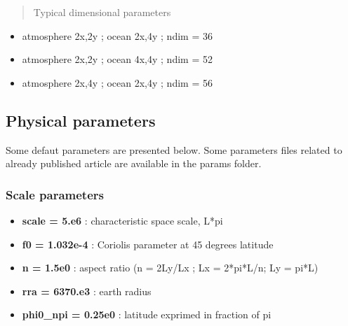 \documentclass[letterpaper,10pt,english]{sphinxmanual}
\begin{document}
\begin{quote}\begin{description}
\item[{Typical dimensional parameters}] \leavevmode
\end{description}\end{quote}
\begin{itemize}
\item {} 
atmosphere 2x,2y ; ocean 2x,4y ; ndim = 36

\item {} 
atmosphere 2x,2y ; ocean 4x,4y ; ndim = 52

\item {} 
atmosphere 2x,4y ; ocean 2x,4y ; ndim = 56

\end{itemize}


\subsection{Physical parameters}
\label{rstfiles/params_maooam:physical-parameters}
Some defaut parameters are presented below.
Some parameters files related to already published article are available in the params folder.


\subsubsection{Scale parameters}
\label{rstfiles/params_maooam:scale-parameters}\begin{itemize}
\item {} 
\textbf{scale = 5.e6}  : characteristic space scale, L*pi

\item {} 
\textbf{f0 = 1.032e-4}  : Coriolis parameter at 45 degrees latitude

\item {} 
\textbf{n = 1.5e0}  : aspect ratio (n = 2Ly/Lx ; Lx = 2*pi*L/n; Ly = pi*L)

\item {} 
\textbf{rra = 6370.e3}  : earth radius

\item {} 
\textbf{phi0\_npi = 0.25e0}  : latitude exprimed in fraction of pi

\end{itemize}
\end{document}
